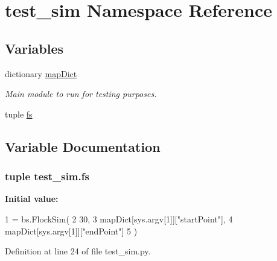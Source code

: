 \hypertarget{namespacetest__sim}{\section{test\-\_\-sim Namespace Reference}
\label{namespacetest__sim}
}
\subsection*{Variables}
\begin{DoxyCompactItemize}
\item 
dictionary \hyperlink{namespacetest__sim_a7550c4b395516fd2fa13ebfd927c9908}{map\-Dict}
\begin{DoxyCompactList}\small\item\em Main module to run for testing purposes. \end{DoxyCompactList}\item 
tuple \hyperlink{namespacetest__sim_a2054957d15e42445f7dc826058f9799d}{fs}
\end{DoxyCompactItemize}


\subsection{Variable Documentation}
\hypertarget{namespacetest__sim_a2054957d15e42445f7dc826058f9799d}{
\subsubsection[{fs}]{\setlength{\rightskip}{0pt plus 5cm}tuple test\-\_\-sim.\-fs}}\label{namespacetest__sim_a2054957d15e42445f7dc826058f9799d}
{\bfseries Initial value\-:}
\begin{DoxyCode}
1 = bs.FlockSim(
2         30, 
3         mapDict[sys.argv[1]][\textcolor{stringliteral}{"startPoint"}], 
4         mapDict[sys.argv[1]][\textcolor{stringliteral}{"endPoint"}]
5     )
\end{DoxyCode}


Definition at line 24 of file test\-\_\-sim.\-py.

